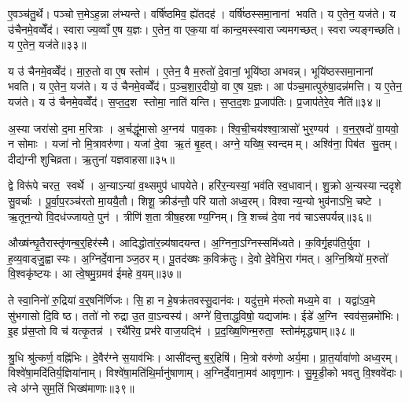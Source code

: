 ए॒वञ्च॑तु॒र्थे। पञ्चोत्त॒मेऽह॒न्ना ल॑भ्यन्ते। वर्\mbox{}षि॑ष्ठमिव॒ ह्ये॑तदह॑। वर्\mbox{}षि॑ष्ठस्समा॒नानां भवति। य ए॒तेन॒ यज॑ते। य उ॑चैनमे॒वव्वेँद॑। स्वाराज्य॒व्वाँ ए॒ष य॒ज्ञः। ए॒तेन॒ वा एक॒या वा॑ कान्द॒मस्स्वाराज्यमगच्छत्। स्वराज्यङ्गच्छति। य ए॒तेन॒ यज॑ते॥३३॥

य उ॑ चैनमे॒वव्वेँद॑। मा॒रु॒तो वा ए॒ष स्तोम॑। ए॒तेन॒ वै म॒रुतो॑ दे॒वानां॒ भूयि॑ष्ठा अभवन्न्। भूयि॑ष्ठस्समा॒नानां भवति। य ए॒तेन॒ यज॑ते। य उ॑ चैनमे॒वव्वेँद॑। प॒ञ्च॒शा॒र॒दीयो॒ वा ए॒ष य॒ज्ञः। आ प॑ञ्च॒मात्पुरु॑षा॒दन्न॑मत्ति। य ए॒तेन॒ यज॑ते। य उ॑ चैनमे॒वव्वेँद॑। स॒प्त॒द॒श स्तोमा॒ नाति॑ यन्ति। स॒प्त॒द॒शः प्र॒जाप॑तिः। प्र॒जाप॑तेरे॒व नैति॑॥३४॥\anuvakamend[तृ॒तीये॑ गच्छति॒ य ए॒तेन॒ यज॑तेऽत्ति॒ य ए॒तेन॒ यज॑ते॒ य उ॑ चैनमे॒वव्वेँद॒ त्रीणि॑ च (अ॒गस्त्य॒ स्वाराज्यं मारु॒तः प॑ञ्चशार॒दीयो॒ वा ए॒ष य॒ज्ञस्स॑प्तद॒शं प्र॒जाप॑तेरे॒व नैति॑ ॥ )]

अ॒स्या जरा॑सो द॒मा म॒रित्राः। अ॒र्चद्धू॑मासो अ॒ग्नय॑ पाव॒काः। श्वि॒ची॒चय॑श्श्वा॒त्रासो॑ भुर॒ण्यव॑। व॒न॒र्॒षदो॑ वा॒यवो॒ न सोमाः। यजा॑ नो मि॒त्रावरु॑णा। यजा॑ दे॒वा ऋ॒तं बृ॒हत्। अग्ने॒ यख्षि॒ स्वन्दमम्। अश्वि॑ना॒ पिब॑त सु॒तम्। दीद्य॑ग्नी शुचिव्रता। ऋ॒तुना॑ यज्ञवाहसा॥३५॥

द्वे विरू॑पे चरत॒ स्वर्थे। अ॒न्याऽन्या॑ व॒थ्समुप॑ धापयेते। हरि॑र॒न्यस्यां॒ भव॑ति स्व॒धावान्॑। शु॒क्रो अ॒न्यस्यान्ददृशे सु॒वर्चाः। पू॒र्वा॒प॒रञ्च॑रतो मा॒ययै॒तौ। शिशू॒ क्रीड॑न्तौ॒ परि॑ यातो अध्व॒रम्। विश्वान्य॒न्यो भुव॑नाऽभि॒ चष्टे। ऋ॒तून॒न्यो वि॒दध॑ज्जायते॒ पुन॑। त्रीणि॑ श॒ता त्रीष॒हस्राण्य॒ग्निम्। त्रि॒शच्च॑ दे॒वा नव॑ चाऽसपर्यन्न्॥३६॥

औख्ष॑न्घृ॒तैरास्तृ॑णन्ब॒र्॒हिर॑स्मै। आदिद्धोता॑र॒न्न्य॑षादयन्त। अ॒ग्निना॒ऽग्निस्समि॑ध्यते। क॒विर्गृ॒हप॑ति॒र्युवा। ह॒व्य॒वाड्जु॒ह्वास्यः। अ॒ग्निर्दे॒वानाञ्ज॒ठरम्। पू॒तद॑ख्षः क॒विक्र॑तुः। दे॒वो दे॒वेभि॒रा ग॑मत्। अ॒ग्नि॒श्रियो॑ म॒रुतो॑ वि॒श्वकृ॑ष्टयः। आ त्वे॒षमु॒ग्रमव॑ ईमहे व॒यम्॥३७॥

ते स्वा॒निनो॑ रु॒द्रिया॑ व॒र्॒षनि॑र्णिजः। सि॒हा न हे॒षक्र॑तवस्सु॒दान॑वः। यदु॑त्त॒मे म॑रुतो मध्य॒मे वा। यद्वा॑ऽव॒मे सु॑भगासो दि॒वि ष्ठ। ततो॑ नो रुद्रा उ॒त वा॒ऽन्वस्य॑। अग्ने॑ वि॒त्ताद्ध॒विषो॒ यद्यजा॑मः। ईडे॑ अ॒ग्नि स्वव॑स॒न्नमो॑भिः। इ॒ह प्र॑स॒प्तो वि च॑ यत्कृ॒तन्न॑। रथै॑रिव॒ प्रभ॑रे वाज॒यद्भि॑। प्र॒द॒ख्षि॒णिन्म॒रुता॒ स्तोम॑मृद्ध्याम्॥३८॥

श्रु॒धि श्रु॑त्कर्ण॒ वह्नि॑भिः। दे॒वैर॑ग्ने स॒याव॑भिः। आसी॑दन्तु ब॒र्॒हिषि॑। मि॒त्रो वरु॑णो अर्य॒मा। प्रा॒त॒र्यावा॑णो अध्व॒रम्। विश्वे॑षा॒मदि॑तिर्य॒ज्ञिया॑नाम्। विश्वे॑षा॒मति॑थि॒र्मानु॑षाणाम्। अ॒ग्निर्दे॒वाना॒मव॑ आवृणा॒नः। सु॒मृ॒डी॒को भवतु वि॒श्ववे॑दाः। त्वे अ॑ग्ने सुम॒तिं भिख्ष॑माणाः॥३९॥

